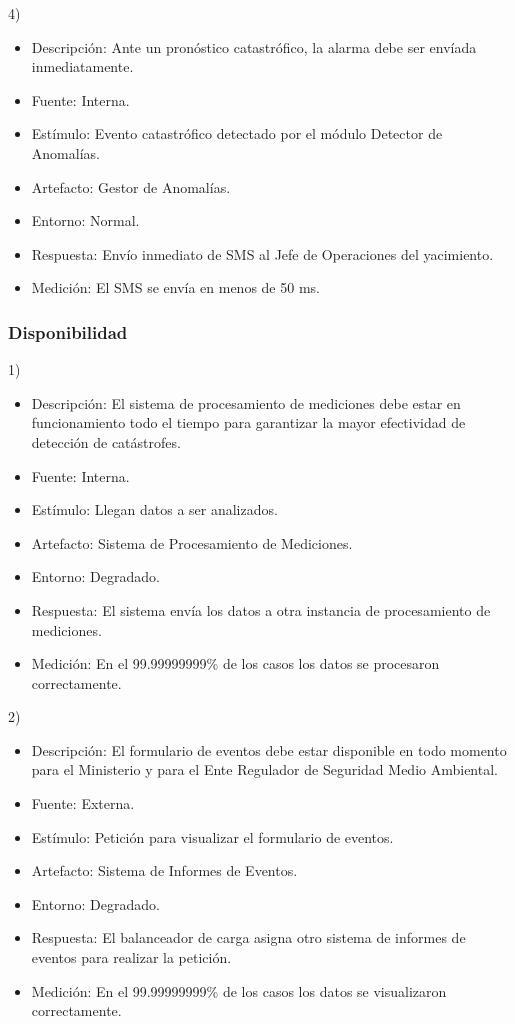 \documentclass{article}
\theoremstyle{definition}
\theoremstyle{remark}
\begin{document}
\pagebreak

4)
\begin{itemize}
  \item Descripción: Ante un pronóstico catastrófico, la alarma debe ser envíada inmediatamente.
  \item Fuente: Interna.
  \item Estímulo: Evento catastrófico detectado por el módulo Detector de Anomalías.
  \item Artefacto: Gestor de Anomalías.
  \item Entorno: Normal.
  \item Respuesta: Envío inmediato de SMS al Jefe de Operaciones del yacimiento.
  \item Medición: El SMS se envía en menos de 50 ms.
\end{itemize}

\subsubsection{Disponibilidad}

1)
\begin{itemize}
  \item Descripción: El sistema de procesamiento de mediciones debe estar en funcionamiento todo el tiempo para garantizar la mayor efectividad de detección de catástrofes.
  \item Fuente: Interna.
  \item Estímulo: Llegan datos a ser analizados.
  \item Artefacto: Sistema de Procesamiento de Mediciones.
  \item Entorno: Degradado.
  \item Respuesta: El sistema envía los datos a otra instancia de procesamiento de mediciones.
  \item Medición: En el 99.99999999\% de los casos los datos se procesaron correctamente.
\end{itemize}

2)
\begin{itemize}
  \item Descripción: El formulario de eventos debe estar disponible en todo momento para el Ministerio y para el Ente Regulador de Seguridad Medio Ambiental.
  \item Fuente: Externa.
  \item Estímulo: Petición para visualizar el formulario de eventos.
  \item Artefacto: Sistema de Informes de Eventos.
  \item Entorno: Degradado.
  \item Respuesta: El balanceador de carga asigna otro sistema de informes de eventos para realizar la petición.
  \item Medición: En el 99.99999999\% de los casos los datos se visualizaron correctamente.
\end{itemize}
\end{document}
